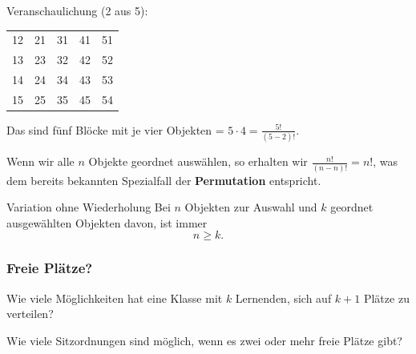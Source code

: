 Veranschaulichung (2 aus 5):

\begin{tabular}{c|c|c|c|c}
12 & 21 & 31 & 41 & 51\\
13 & 23 & 32 & 42 & 52\\
14 & 24 & 34 & 43 & 53\\
15 & 25 & 35 & 45 & 54\\
\end{tabular}

Das sind fünf Blöcke mit je vier Objekten = $5\cdot{}4 = \frac{5!}{(5-2)!}$.
\newpage

\begin{bemerkung}{}{}
Wenn wir alle $n$ Objekte geordnet auswählen, so erhalten wir
$\frac{n!}{(n-n)!} = n!$, was dem bereits bekannten Spezialfall der \textbf{Permutation}
entspricht.
\end{bemerkung}



\begin{gesetz}{Variation ohne Wiederholung}{}
Bei $n$ Objekten zur Auswahl und $k$ geordnet ausgewählten Objekten davon, ist immer
$$n \ge{} k.$$
\end{gesetz}
\newpage

\subsubsection{Freie Plätze?}

Wie viele Möglichkeiten hat eine Klasse mit $k$ Lernenden, sich auf
$k+1$ Plätze zu verteilen?


Wie viele Sitzordnungen sind möglich, wenn es zwei oder mehr freie Plätze gibt?

